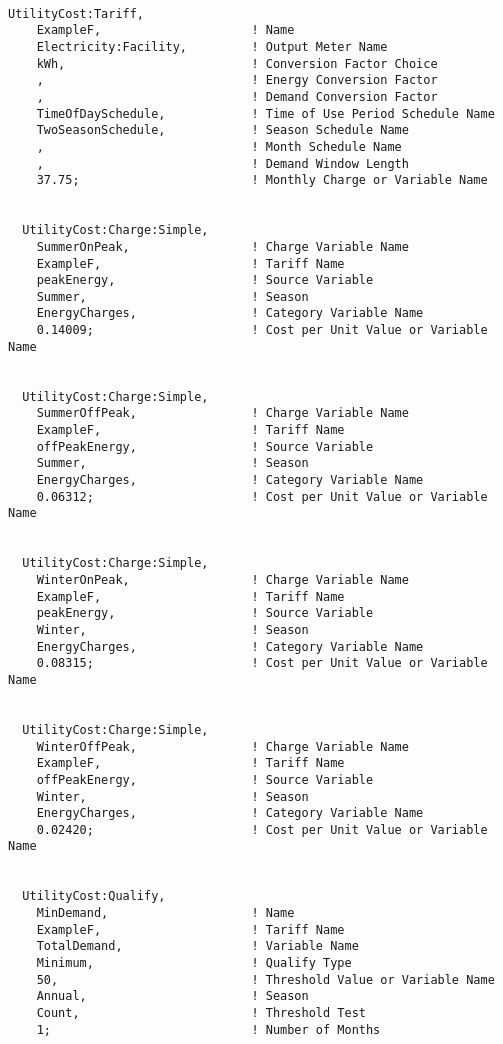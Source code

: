 \begin{lstlisting}

UtilityCost:Tariff,
    ExampleF,                     ! Name
    Electricity:Facility,         ! Output Meter Name
    kWh,                          ! Conversion Factor Choice
    ,                             ! Energy Conversion Factor
    ,                             ! Demand Conversion Factor
    TimeOfDaySchedule,            ! Time of Use Period Schedule Name
    TwoSeasonSchedule,            ! Season Schedule Name
    ,                             ! Month Schedule Name
    ,                             ! Demand Window Length
    37.75;                        ! Monthly Charge or Variable Name


  UtilityCost:Charge:Simple,
    SummerOnPeak,                 ! Charge Variable Name
    ExampleF,                     ! Tariff Name
    peakEnergy,                   ! Source Variable
    Summer,                       ! Season
    EnergyCharges,                ! Category Variable Name
    0.14009;                      ! Cost per Unit Value or Variable Name


  UtilityCost:Charge:Simple,
    SummerOffPeak,                ! Charge Variable Name
    ExampleF,                     ! Tariff Name
    offPeakEnergy,                ! Source Variable
    Summer,                       ! Season
    EnergyCharges,                ! Category Variable Name
    0.06312;                      ! Cost per Unit Value or Variable Name


  UtilityCost:Charge:Simple,
    WinterOnPeak,                 ! Charge Variable Name
    ExampleF,                     ! Tariff Name
    peakEnergy,                   ! Source Variable
    Winter,                       ! Season
    EnergyCharges,                ! Category Variable Name
    0.08315;                      ! Cost per Unit Value or Variable Name


  UtilityCost:Charge:Simple,
    WinterOffPeak,                ! Charge Variable Name
    ExampleF,                     ! Tariff Name
    offPeakEnergy,                ! Source Variable
    Winter,                       ! Season
    EnergyCharges,                ! Category Variable Name
    0.02420;                      ! Cost per Unit Value or Variable Name


  UtilityCost:Qualify,
    MinDemand,                    ! Name
    ExampleF,                     ! Tariff Name
    TotalDemand,                  ! Variable Name
    Minimum,                      ! Qualify Type
    50,                           ! Threshold Value or Variable Name
    Annual,                       ! Season
    Count,                        ! Threshold Test
    1;                            ! Number of Months



\end{lstlisting}
